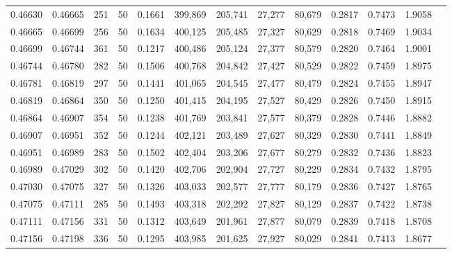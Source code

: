 \begin{tabular}{rrrrrrrrrrrrr}
0.46630 & 0.46665 &   251 &  50 &                                     0.1661 & 399,869 & 205,741 &  27,277 &  80,679 & 0.2817 & 0.7473 & 1.9058 \\
0.46665 & 0.46699 &   256 &  50 &                                     0.1634 & 400,125 & 205,485 &  27,327 &  80,629 & 0.2818 & 0.7469 & 1.9034 \\
0.46699 & 0.46744 &   361 &  50 &                                     0.1217 & 400,486 & 205,124 &  27,377 &  80,579 & 0.2820 & 0.7464 & 1.9001 \\
0.46744 & 0.46780 &   282 &  50 &                                     0.1506 & 400,768 & 204,842 &  27,427 &  80,529 & 0.2822 & 0.7459 & 1.8975 \\
0.46781 & 0.46819 &   297 &  50 &                                     0.1441 & 401,065 & 204,545 &  27,477 &  80,479 & 0.2824 & 0.7455 & 1.8947 \\
0.46819 & 0.46864 &   350 &  50 &                                     0.1250 & 401,415 & 204,195 &  27,527 &  80,429 & 0.2826 & 0.7450 & 1.8915 \\
0.46864 & 0.46907 &   354 &  50 &                                     0.1238 & 401,769 & 203,841 &  27,577 &  80,379 & 0.2828 & 0.7446 & 1.8882 \\
0.46907 & 0.46951 &   352 &  50 &                                     0.1244 & 402,121 & 203,489 &  27,627 &  80,329 & 0.2830 & 0.7441 & 1.8849 \\
0.46951 & 0.46989 &   283 &  50 &                                     0.1502 & 402,404 & 203,206 &  27,677 &  80,279 & 0.2832 & 0.7436 & 1.8823 \\
0.46989 & 0.47029 &   302 &  50 &                                     0.1420 & 402,706 & 202,904 &  27,727 &  80,229 & 0.2834 & 0.7432 & 1.8795 \\
0.47030 & 0.47075 &   327 &  50 &                                     0.1326 & 403,033 & 202,577 &  27,777 &  80,179 & 0.2836 & 0.7427 & 1.8765 \\
0.47075 & 0.47111 &   285 &  50 &                                     0.1493 & 403,318 & 202,292 &  27,827 &  80,129 & 0.2837 & 0.7422 & 1.8738 \\
0.47111 & 0.47156 &   331 &  50 &                                     0.1312 & 403,649 & 201,961 &  27,877 &  80,079 & 0.2839 & 0.7418 & 1.8708 \\
0.47156 & 0.47198 &   336 &  50 &                                     0.1295 & 403,985 & 201,625 &  27,927 &  80,029 & 0.2841 & 0.7413 & 1.8677 \\

\end{tabular}
